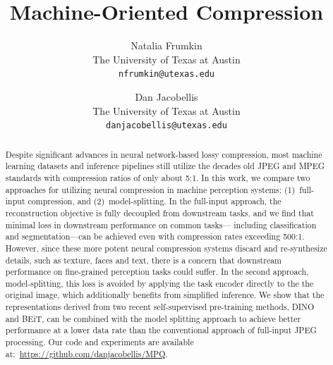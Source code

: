 \documentclass[10pt,twocolumn,letterpaper]{article}
\begin{document}
\title{Machine-Oriented Compression}

\author{Natalia Frumkin\\
The University of Texas at Austin\\
{\tt\small nfrumkin@utexas.edu}
\and
Dan Jacobellis\\
The University of Texas at Austin\\
{\tt\small danjacobellis@utexas.edu}
}

\maketitle


\begin{abstract}
Despite significant advances in neural network-based lossy compression, most machine learning datasets and inference pipelines still utilize the decades old JPEG and MPEG standards with compression ratios of only about 5:1.  In this work, we compare two approaches for utilizing neural compression in machine perception systems: (1)~full-input compression, and (2)~model-splitting. In the full-input approach, the reconstruction objective is fully decoupled from downstream tasks, and we find that minimal loss in downstream performance on common tasks--- including classification and segmentation---can be achieved even with compression rates exceeding 500:1. However, since these more potent neural compression systems discard and re-synthesize details, such as texture, faces and text, there is a concern that downstream performance on fine-grained perception tasks could suffer. In the second approach, model-splitting, this loss is avoided by applying the task encoder directly to the the original image, which additionally benefits from simplified inference. We show that the representations derived from two recent self-supervised pre-training methods, DINO and BEiT, can be combined with the model splitting approach to achieve better performance at a lower data rate than the conventional approach of full-input JPEG processing. Our code and experiments are available at:~\url{https://github.com/danjacobellis/MPQ}.
\end{abstract}
\end{document}
